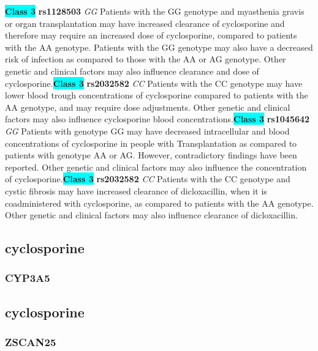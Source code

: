 \documentclass{book}
\begin{document}
\begin{center}
\textbf{\colorbox{cyan} {Class 3}} \textbf{ rs1128503 } \textit{ GG }
Patients with the GG genotype and myasthenia gravis or organ transplantation may have increased clearance of cyclosporine and therefore may require an increased dose of cyclosporine, compared to patients with the AA genotype. Patients with the GG genotype may also have a decreased risk of infection as compared to those with the AA or AG genotype. Other genetic and clinical factors may also influence clearance and dose of cyclosporine.\textbf{\colorbox{cyan} {Class 3}} \textbf{ rs2032582 } \textit{ CC }
Patients with the CC genotype may have lower blood trough concentrations of cyclosporine compared to patients with the AA genotype, and may require dose adjustments. Other genetic and clinical factors may also influence cyclosporine blood concentrations.\textbf{\colorbox{cyan} {Class 3}} \textbf{ rs1045642 } \textit{ GG }
Patients with genotype GG may have decreased intracellular and blood concentrations of cyclosporine in people with Transplantation as compared to patients with genotype AA or AG. However, contradictory findings have been reported. Other genetic and clinical factors may also influence the concentration of cyclosporine.\textbf{\colorbox{cyan} {Class 3}} \textbf{ rs2032582 } \textit{ CC }
Patients with the CC genotype and cystic fibrosis may have increased clearance of dicloxacillin, when it is coadministered with cyclosporine, as compared to patients with the AA genotype. Other genetic and clinical factors may also influence clearance of dicloxacillin.


\end{center}\subsection{ cyclosporine }


\subsubsection{ CYP3A5 }

\begin{center}



\end{center}\subsection{ cyclosporine }


\subsubsection{ ZSCAN25 }
\end{document}
